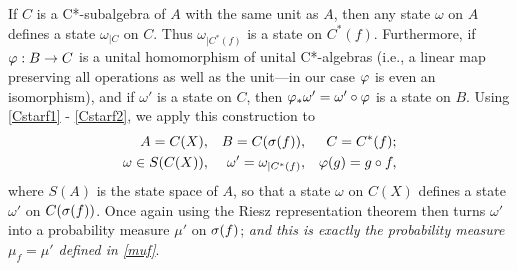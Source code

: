 \documentclass[11pt,a4paper]{article}
\numberwithin{equation}{section}
\newcommand{\er}{\eqref}
\newcommand{\raw}{\rightarrow}
\newcommand{\om}{\omega} \newcommand{\Om}{\Omega}
\begin{document}
  If $C$ is a C*-subalgebra of $A$ with the same unit as $A$, then any state $\om$ on $A$ defines a state $\om_{|C}$ on $C$. Thus $\om_{|C^*(f)}$ is a state on $C^*(f)$. Furthermore, if $\phv:B\raw C$ is a unital homomorphism of unital C*-algebras (i.e., a linear map preserving all operations as well as the unit---in our case $\varphi$ is even an isomorphism), and if $\om'$ is a state on $C$, then $\phv_*\om'= \om'\circ \phv$ is a state on $B$. Using  \er{Cstarf1} - \er{Cstarf2}, we apply this construction to
\begin{align}
A=C(X), && B=C(\sg(f)), && C= C^*(f); \label{CBM1} 
\\  \om\in S(C(X)), && \om'=\om_{|C^*(f)}, && \phv(g)=g\circ f,\label{CBM2}
\end{align}
where $S(A)$ is the state space of $A$,  so that a state $\om$  on $C(X)$  defines a state $\om'$ on $C(\sigma(f))$. Once again using the Riesz representation theorem then turns $\om'$ into a probability measure $\mu'$ on $\sigma(f)$;  \emph{and this is exactly the probability measure 
 $\mu_f=\mu'$ defined in \er{muf}}.
 
\end{document}
